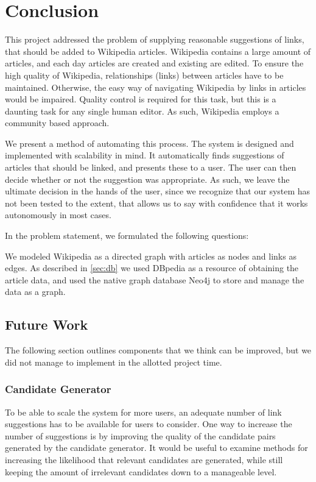 \chapter{Conclusion}\label{chap:conclusion}
This project addressed the problem of supplying reasonable suggestions of links, that should be added to Wikipedia articles. Wikipedia contains a large amount of articles, and each day articles are created and existing are edited. To ensure the high quality of Wikipedia, relationships (links) between articles have to be maintained. Otherwise, the easy way of navigating Wikipedia by links in articles would be impaired. Quality control is required for this task, but this is a daunting task for any single human editor. As such, Wikipedia employs a community based approach. 

We present a method of automating this process. The system is designed and implemented with scalability in mind. It automatically finds suggestions of articles that should be linked, and presents these to a user. The user can then decide whether or not the suggestion was appropriate. As such, we leave the ultimate decision in the hands of the user, since we recognize that our system has not been tested to the extent, that allows us to say with confidence that it works autonomously in most cases.

In the problem statement, we formulated the following questions:

\subproblems

We modeled Wikipedia as a directed graph with articles as nodes and links as edges. As described in \cref{sec:db} we used DBpedia as a resource of obtaining the article data, and used the native graph database Neo4j to store and manage the data as a graph.


\section{Future Work}\label{sec:future_work}
The following section outlines components that we think can be improved, but we did not manage to implement in the allotted project time.

\subsection{Candidate Generator}
To be able to scale the system for more users, an adequate number of link suggestions has to be available for users to consider. One way to increase the number of suggestions is by improving the quality of the candidate pairs generated by the candidate generator. It would be useful to examine methods for increasing the likelihood that relevant candidates are generated, while still keeping the amount of irrelevant candidates down to a manageable level.

